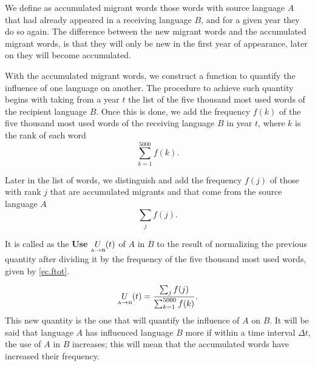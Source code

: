 \documentclass[10pt,letterpaper]{article} %
\begin{document}
	We define as accumulated migrant words those words with source language $A$
	that had already appeared in a receiving language $B$, and for a given year
	they do so again. The difference between the new migrant words and the
	accumulated migrant words, is that they will only be new in the first year of
	appearance, later on they will become accumulated.
	
	With the accumulated migrant words, we construct a function to quantify the
	influence of one language on 
	another. The procedure to
	achieve such quantity begins with taking from a year $t$ the list of the five
	thousand most used words of the recipient language $B$. Once this is done, we
	add the frequency $f(k)$ of the five thousand most used words of the receiving
	language $B$ in year $t$, where $k$ is the rank of each word
	\begin{equation}
	\label{ec.ftot}
	\sum_{k=1}^{5000} f(k).
	\end{equation}
	
	Later in the list of words, we distinguish and add the frequency $f(j)$  of
	those with rank $j$ that are accumulated migrants and that come from the source
	language $A$ 
	\begin{equation}
	\label{ec.fpres}
	\sum_{j} f(j).
	\end{equation}
	
	It is called as the \textbf{Use} $\underset{ \text{\tiny A} \to \text{\tiny B} }{U}(t)$ of $A$ in $B$ to the result of normalizing the previous quantity after dividing it by the frequency of the five thousand most used words, given by \ref{ec.ftot}.
	
	\begin{equation}
	\label{ec.fuso1}
	\underset{ \text{\tiny A} \to  \text{\tiny B} }{U}(t) = \frac{\sum_{j} f(j)}{\sum_{k=1}^{5000} f(k)}.
	\end{equation}
	This new quantity is the one that will quantify the influence of $A$ on $B$. It will be said that language $A$ has influenced language $B$ more if within a time interval $\Delta t$, the use of $A$ in $B$ increases; this will mean that the accumulated words have increased their frequency.
	
\end{document}
